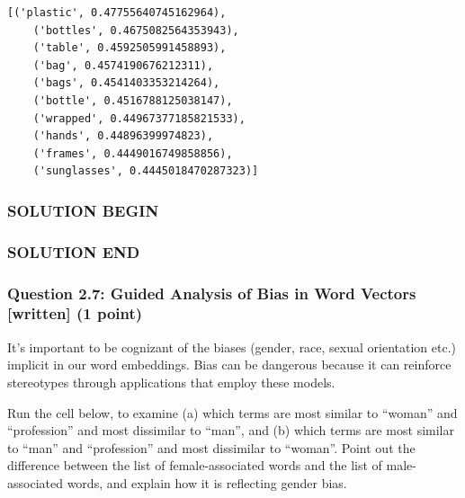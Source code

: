 \documentclass[11pt]{article}
\begin{document}
\begin{Verbatim}[commandchars=\\\{\}]
    [('plastic', 0.47755640745162964),
    ('bottles', 0.4675082564353943),
    ('table', 0.4592505991458893),
    ('bag', 0.4574190676212311),
    ('bags', 0.4541403353214264),
    ('bottle', 0.4516788125038147),
    ('wrapped', 0.44967377185821533),
    ('hands', 0.44896399974823),
    ('frames', 0.4449016749858856),
    ('sunglasses', 0.4445018470287323)]
\end{Verbatim}

\subsubsection{SOLUTION BEGIN}\label{solution-begin}

\subsubsection{SOLUTION END}\label{solution-end}

\subsubsection{Question 2.7: Guided Analysis of Bias in Word Vectors
{[}written{]} (1
point)}\label{question-2.7-guided-analysis-of-bias-in-word-vectors-written-1-point}

It's important to be cognizant of the biases (gender, race, sexual
orientation etc.) implicit in our word embeddings. Bias can be dangerous
because it can reinforce stereotypes through applications that employ
these models.

Run the cell below, to examine (a) which terms are most similar to
``woman'' and ``profession'' and most dissimilar to ``man'', and (b)
which terms are most similar to ``man'' and ``profession'' and most
dissimilar to ``woman''. Point out the difference between the list of
female-associated words and the list of male-associated words, and
explain how it is reflecting gender bias.
\end{document}
